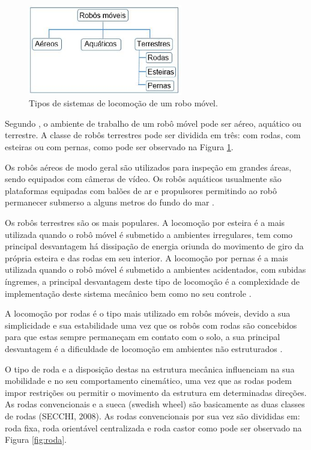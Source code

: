 \begin{figure}[H]
    \centering
    \includegraphics[width=0.6\textwidth]{figuras/locomocao.eps}
    \caption{Tipos de sistemas de locomoção de um robo móvel.}
    \label{fig:locomocao}
\end{figure}

Segundo , o ambiente de trabalho de um robô móvel pode ser aéreo, aquático ou terrestre. A classe de robôs
terrestres pode ser dividida em três: com rodas, com esteiras ou com pernas, como pode ser observado na Figura \ref{fig:locomocao}.

Os robôs aéreos de modo geral são utilizados para inspeção em grandes áreas, sendo equipados com câmeras de vídeo.  Os robôs aquáticos
usualmente são plataformas equipadas com balões de ar e propulsores permitindo ao robô permanecer submerso a alguns metros do fundo do
mar \cite{pieri:2002}.

Os robôs terrestres são os mais populares. A locomoção por esteira é a mais utilizada quando o robô móvel é submetido a ambientes
irregulares, tem como principal desvantagem há dissipação de energia oriunda do movimento de giro da própria esteira e das rodas em seu
interior. A locomoção por pernas é a mais utilizada quando o robô móvel é submetido a ambientes acidentados, com subidas íngremes, a
principal desvantagem deste tipo de locomoção é a complexidade de implementação deste sistema mecânico bem como no seu controle \cite{pieri:2002}.

A locomoção por rodas é o tipo mais utilizado em robôs móveis, devido a sua simplicidade e sua estabilidade uma vez que os robôs com
rodas são concebidos para que estas sempre permaneçam em contato com o solo, a sua principal desvantagem é a dificuldade de locomoção
em ambientes não estruturados \cite{pieri:2002} \cite{siegwart:2002}. 

O tipo de roda e a disposição destas na estrutura mecânica influenciam na sua mobilidade e no seu comportamento cinemático, uma vez
que as rodas podem impor restrições ou permitir o movimento da estrutura em determinadas direções. As rodas convencionais e a sueca
(swedish wheel) são basicamente as duas classes de rodas (SECCHI, 2008). As rodas convencionais por sua vez são divididas em: roda fixa,
roda orientável centralizada e roda castor como pode ser observado na Figura \ref{fig:roda}.

